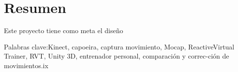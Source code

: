 %
%


\chapter*{Resumen}

Este proyecto tiene como meta el diseño


Palabras clave:Kinect, capoeira, captura movimiento, Mocap, ReactiveVirtual Trainer, RVT, Unity 3D, entrenador personal, comparación y correc-ción de movimientos.ix
